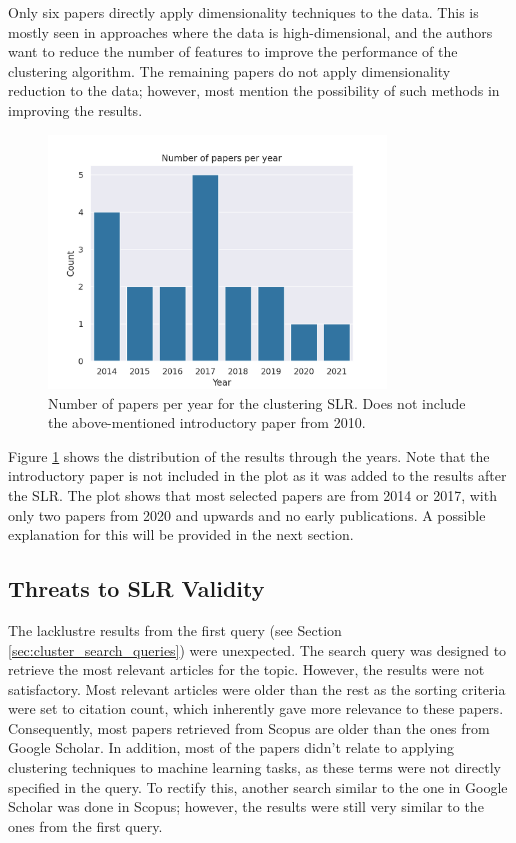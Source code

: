 Only six papers directly apply dimensionality techniques to the data. This is mostly seen in approaches where the data is high-dimensional, and the authors want to reduce the number of features to improve the performance of the clustering algorithm. The remaining papers do not apply dimensionality reduction to the data; however, most mention the possibility of such methods in improving the results.


\begin{figure}[]
    \centering
    \includegraphics[width=0.8\textwidth]{figures/clustering_papers_per_year.png}
    \caption[Number of papers per year for the clustering SLR]{Number of papers per year for the clustering SLR. Does not include the above-mentioned introductory paper from 2010.}
    \label{fig:cluster_papers_year}
\end{figure}

Figure \ref{fig:cluster_papers_year} shows the distribution of the results through the years. Note that the introductory paper \cite{Jain_Dataclustering50_2010} is not included in the plot as it was added to the results after the SLR. The plot shows that most selected papers are from 2014 or 2017, with only two papers from 2020 and upwards and no early publications. A possible explanation for this will be provided in the next section.

\subsection{Threats to SLR Validity}\label{sec:sota_clustering_threats}
The lacklustre results from the first query (see Section \ref{sec:cluster_search_queries}) were unexpected. The search query was designed to retrieve the most relevant articles for the topic. However, the results were not satisfactory. Most relevant articles were older than the rest as the sorting criteria were set to citation count, which inherently gave more relevance to these papers. Consequently, most papers retrieved from Scopus are older than the ones from Google Scholar. In addition, most of the papers didn't relate to applying clustering techniques to machine learning tasks, as these terms were not directly specified in the query. To rectify this, another search similar to the one in Google Scholar was done in Scopus; however, the results were still very similar to the ones from the first query.

